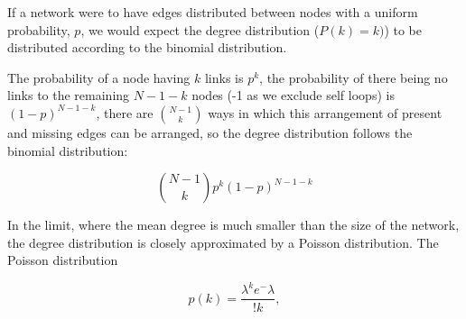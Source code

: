 If a network were to have edges distributed between nodes with a uniform probability, $p$, we would expect the degree distribution ($P(k)=k)$) to be distributed according to the binomial distribution.  

 The probability of a node having $k$ links is $p^k$, the probability of there being no links to the remaining $N-1-k$ nodes (-1 as we exclude self loops) is $(1-p)^{N-1-k}$, there are $\binom{N-1}{k}$ ways in which this arrangement of present and missing edges can be arranged, so the degree distribution follows the binomial distribution\cite{barabasi2016network}:

\begin{equation}
   \binom{N-1}{k}        p^k (1-p)^{N-1-k}
   \label{Equation:BinomialDistributionForDegreeProbability}
\end{equation}

In the limit, where the mean degree is much smaller than the size of the network, the degree distribution is closely approximated by a Poisson distribution\cite{barabasi2016network}. The Poisson distribution

\begin{equation}
    p(k) = \frac{\lambda^k e ^-\lambda}{!k},
\end{equation}

